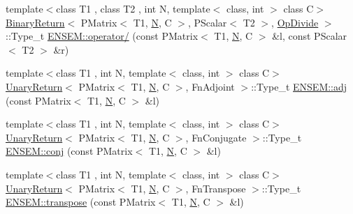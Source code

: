\begin{DoxyCompactItemize}
\item 
{\footnotesize template$<$class T1 , class T2 , int N, template$<$ class, int $>$ class C$>$ }\\\mbox{\hyperlink{structBinaryReturn}{Binary\+Return}}$<$ P\+Matrix$<$ T1, \mbox{\hyperlink{adat__devel_2lib_2hadron_2operator__name__util_8cc_a7722c8ecbb62d99aee7ce68b1752f337}{N}}, C $>$, P\+Scalar$<$ T2 $>$, \mbox{\hyperlink{structOpDivide}{Op\+Divide}} $>$\+::Type\+\_\+t \mbox{\hyperlink{group__primmatrix_ga1b00e76a765453dfbb33f0630bd863c3}{E\+N\+S\+E\+M\+::operator/}} (const P\+Matrix$<$ T1, \mbox{\hyperlink{adat__devel_2lib_2hadron_2operator__name__util_8cc_a7722c8ecbb62d99aee7ce68b1752f337}{N}}, C $>$ \&l, const P\+Scalar$<$ T2 $>$ \&r)
\item 
{\footnotesize template$<$class T1 , int N, template$<$ class, int $>$ class C$>$ }\\\mbox{\hyperlink{structUnaryReturn}{Unary\+Return}}$<$ P\+Matrix$<$ T1, \mbox{\hyperlink{adat__devel_2lib_2hadron_2operator__name__util_8cc_a7722c8ecbb62d99aee7ce68b1752f337}{N}}, C $>$, Fn\+Adjoint $>$\+::Type\+\_\+t \mbox{\hyperlink{group__primmatrix_ga443bf356f8bca93ff78f16db721417b9}{E\+N\+S\+E\+M\+::adj}} (const P\+Matrix$<$ T1, \mbox{\hyperlink{adat__devel_2lib_2hadron_2operator__name__util_8cc_a7722c8ecbb62d99aee7ce68b1752f337}{N}}, C $>$ \&l)
\item 
{\footnotesize template$<$class T1 , int N, template$<$ class, int $>$ class C$>$ }\\\mbox{\hyperlink{structUnaryReturn}{Unary\+Return}}$<$ P\+Matrix$<$ T1, \mbox{\hyperlink{adat__devel_2lib_2hadron_2operator__name__util_8cc_a7722c8ecbb62d99aee7ce68b1752f337}{N}}, C $>$, Fn\+Conjugate $>$\+::Type\+\_\+t \mbox{\hyperlink{group__primmatrix_gabbacb7d7e40fcf5d0bcd18aa907d33ea}{E\+N\+S\+E\+M\+::conj}} (const P\+Matrix$<$ T1, \mbox{\hyperlink{adat__devel_2lib_2hadron_2operator__name__util_8cc_a7722c8ecbb62d99aee7ce68b1752f337}{N}}, C $>$ \&l)
\item 
{\footnotesize template$<$class T1 , int N, template$<$ class, int $>$ class C$>$ }\\\mbox{\hyperlink{structUnaryReturn}{Unary\+Return}}$<$ P\+Matrix$<$ T1, \mbox{\hyperlink{adat__devel_2lib_2hadron_2operator__name__util_8cc_a7722c8ecbb62d99aee7ce68b1752f337}{N}}, C $>$, Fn\+Transpose $>$\+::Type\+\_\+t \mbox{\hyperlink{group__primmatrix_gaffe281aeb23abb6d655321654f855e26}{E\+N\+S\+E\+M\+::transpose}} (const P\+Matrix$<$ T1, \mbox{\hyperlink{adat__devel_2lib_2hadron_2operator__name__util_8cc_a7722c8ecbb62d99aee7ce68b1752f337}{N}}, C $>$ \&l)

\end{DoxyCompactItemize}
